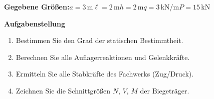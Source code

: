 \documentclass[a4paper,11pt]{article}
\begin{document}
\textbf{Gegebene Größen:}\quad $a=3$\,m\quad $\ell=2$\,m\quad $h=2$\,m\quad $q=3$\,kN/m\quad $P=15$\,kN
\par\medskip
\textbf{Aufgabenstellung}\par
\begin{enumerate}[label=\textbf{\arabic*.}]
  \item Bestimmen Sie den Grad der statischen Bestimmtheit.
  \item Berechnen Sie alle Auflagerreaktionen und Gelenkkräfte.
  \item Ermitteln Sie alle Stabkräfte des Fachwerks (Zug/Druck).
  \item Zeichnen Sie die Schnittgrößen $N$, $V$, $M$ der Biegeträger.
\end{enumerate}
\end{document}
